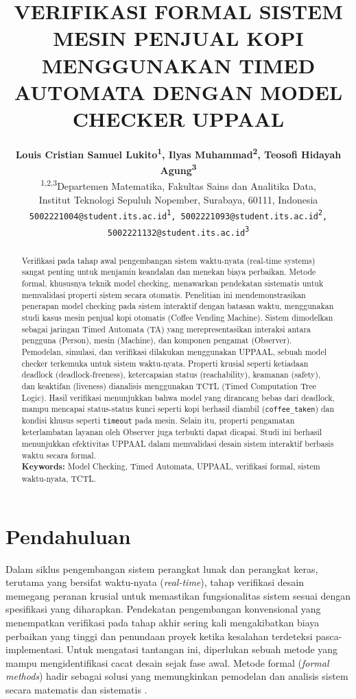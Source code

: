 \documentclass[12pt, a4paper]{article}
\title{
  \fontsize{16}{20}\selectfont
  \bfseries
  \uppercase{Verifikasi Formal Sistem Mesin Penjual Kopi Menggunakan Timed Automata dengan Model Checker UPPAAL}
}
\author{
  \begin{minipage}{\textwidth}
  \centering
  \fontsize{11}{13}\selectfont
  \textbf{Louis Cristian Samuel Lukito\textsuperscript{1}, Ilyas Muhammad\textsuperscript{2}, Teosofi Hidayah Agung\textsuperscript{3}}\\[0.5cm]
  \textsuperscript{1,2,3}Departemen Matematika, Fakultas Sains dan Analitika Data, \\
  Institut Teknologi Sepuluh Nopember, Surabaya, 60111, Indonesia\\[0.3cm]
  \fontsize{9}{11}\selectfont
  \texttt{5002221004@student.its.ac.id\textsuperscript{1}, 5002221093@student.its.ac.id\textsuperscript{2}, 5002221132@student.its.ac.id\textsuperscript{3}}\\[0.5cm]
  \end{minipage}
}
\date{} %
\providecommand{\keywords}[1]{\textbf{Keywords:} #1}
\begin{document}
\maketitle
\thispagestyle{empty} %

\vspace{-1cm}

\begin{abstract}
\noindent
Verifikasi pada tahap awal pengembangan sistem waktu-nyata (real-time systems) sangat penting untuk menjamin keandalan dan menekan biaya perbaikan. Metode formal, khususnya teknik model checking, menawarkan pendekatan sistematis untuk memvalidasi properti sistem secara otomatis. Penelitian ini mendemonstrasikan penerapan model checking pada sistem interaktif dengan batasan waktu, menggunakan studi kasus mesin penjual kopi otomatis (Coffee Vending Machine). Sistem dimodelkan sebagai jaringan Timed Automata (TA) yang merepresentasikan interaksi antara pengguna (Person), mesin (Machine), dan komponen pengamat (Observer). Pemodelan, simulasi, dan verifikasi dilakukan menggunakan UPPAAL, sebuah model checker terkemuka untuk sistem waktu-nyata. Properti krusial seperti ketiadaan deadlock (deadlock-freeness), ketercapaian status (reachability), keamanan (safety), dan keaktifan (liveness) dianalisis menggunakan TCTL (Timed Computation Tree Logic). Hasil verifikasi menunjukkan bahwa model yang dirancang bebas dari deadlock, mampu mencapai status-status kunci seperti kopi berhasil diambil (\texttt{coffee\_taken}) dan kondisi khusus seperti \texttt{timeout} pada mesin. Selain itu, properti pengamatan keterlambatan layanan oleh Observer juga terbukti dapat dicapai. Studi ini berhasil menunjukkan efektivitas UPPAAL dalam memvalidasi desain sistem interaktif berbasis waktu secara formal.\\
\keywords{Model Checking, Timed Automata, UPPAAL, verifikasi formal, sistem waktu-nyata, TCTL.}
\end{abstract}

\section{Pendahuluan}
Dalam siklus pengembangan sistem perangkat lunak dan perangkat keras, terutama yang bersifat waktu-nyata (\textit{real-time}), tahap verifikasi desain memegang peranan krusial untuk memastikan fungsionalitas sistem sesuai dengan spesifikasi yang diharapkan. Pendekatan pengembangan konvensional yang menempatkan verifikasi pada tahap akhir sering kali mengakibatkan biaya perbaikan yang tinggi dan penundaan proyek ketika kesalahan terdeteksi pasca-implementasi. Untuk mengatasi tantangan ini, diperlukan sebuah metode yang mampu mengidentifikasi cacat desain sejak fase awal. Metode formal (\textit{formal methods}) hadir sebagai solusi yang memungkinkan pemodelan dan analisis sistem secara matematis dan sistematis \cite{Clarke1996}.
\end{document}
